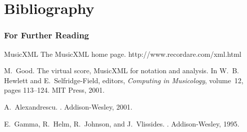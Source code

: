 \documentclass{beamer}
\begin{document}
\section{Bibliography}
\begin{frame}
	\frametitle{For Further Reading}

\begin{thebibliography}{Alexandrescu, 2001}

{\scriptsize 

MusicXML
\newblock The MusicXML home page.
\newblock http://www.recordare.com/xml.html

M.~Good.
\newblock The virtual score, MusicXML for notation and analysis.
\newblock In W.~B. Hewlett and E.~Selfridge-Field, editors, {\em Computing in
  Musicology}, volume~12, pages 113--124. MIT Press, 2001.

A.~Alexandrescu.
.
\newblock Addison-Wesley, 2001.

E.~Gamma, R.~Helm, R.~Johnson, and J.~Vlissides.
.
\newblock Addison-Wesley, 1995.

}
\end{thebibliography}

\end{frame}
\end{document}
